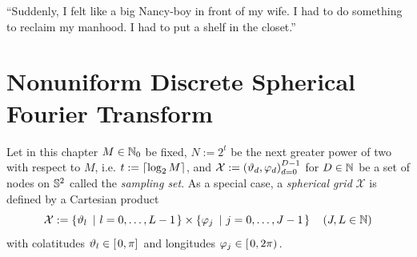 \begin{savequote}[8cm]
  ``Suddenly, I felt like a big Nancy-boy in front of my wife. I had to do something to reclaim my manhood. I had to put a shelf in the closet.''
\end{savequote}
\makeatletter
\chapter{Nonuniform Discrete Spherical Fourier Transform}
\label{DSFT}

Let in this chapter $M \in \mathbb{N}_{0}$ be fixed, $N := 2^t$ be the 
next greater power of two with respect to $M$, i.e. $t := {\left\lceil\log_2 M\right\rceil}$, and $\mathcal{X} := \left(\vartheta_d,\varphi_d\right)_{d=0}^{D-1}$ for $D \in \mathbb{N}$ be
a set of nodes on $\mathbb{S}^2$ called the \emph{sampling set}. As a special case, a \emph{spherical grid} 
$\mathcal{X}$ is defined by a Cartesian product 
\[
  \mathcal{X} := \left\{\vartheta_{l}\ \left|\ l=0,\ldots,L-1\right.\right\rbrace \times \left\{\varphi_{j}\ \left|\ j=0,\ldots,J-1\right.\right\rbrace \quad \left(J,L \in \mathbb{N}\right)
\]
with colatitudes $\vartheta_{l} \in \left[\left.0,\pi\right]\right.$ and longitudes $\varphi_{j} \in \left[\left.0,2\pi\right)\right.$.

